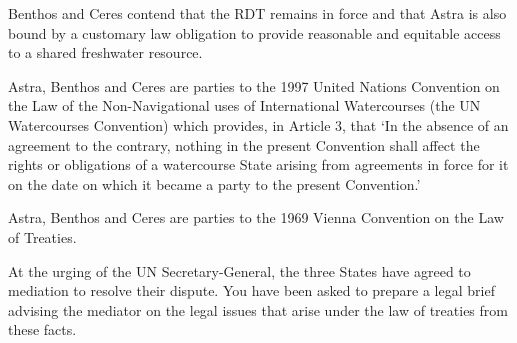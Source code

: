 \begin{tutorialquestion}
    \vspace{\baselineskip}

    Benthos and Ceres contend that the RDT remains in force and that Astra is also bound by a customary law obligation to provide reasonable and equitable access to a shared freshwater resource.

    \vspace{\baselineskip}

    Astra, Benthos and Ceres are parties to the 1997 United Nations Convention on the Law of the Non-Navigational uses of International Watercourses (the UN Watercourses Convention) which provides, in Article 3, that `In the absence of an agreement to the contrary, nothing in the present Convention shall affect the rights or obligations of a watercourse State arising from agreements in force for it on the date on which it became a party to the present Convention.'

    \vspace{\baselineskip}

    Astra, Benthos and Ceres are parties to the 1969 Vienna Convention on the Law of Treaties.

    \vspace{\baselineskip}

    At the urging of the UN Secretary-General, the three States have agreed to mediation to resolve their dispute. You have been asked to prepare a legal brief advising the mediator on the legal issues that arise under the law of treaties from these facts.
\end{tutorialquestion}
